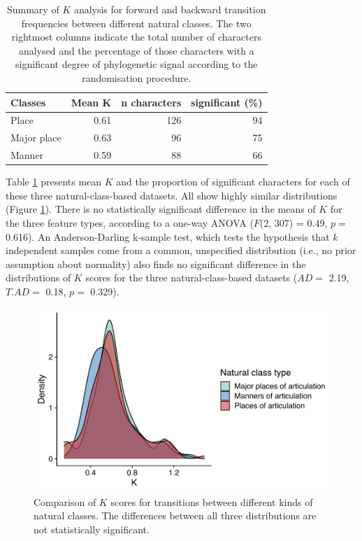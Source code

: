 \begin{table}

\caption[Summary of $K$ analysis for forward and backward transition frequencies, comparing different natural classes]{\label{tab:k-natural-classes-summary}Summary of $K$ analysis for forward and backward transition frequencies between different natural classes. The two rightmost columns indicate the total number of characters analysed and the percentage of those characters with a significant degree of phylogenetic signal according to the randomisation procedure.}
\centering
\begin{tabular}[t]{lrrr}
\toprule
Classes & Mean K & n characters & significant (\%)\\
\midrule
Place & 0.61 & 126 & 94\\
Major place & 0.63 & 96 & 75\\
Manner & 0.59 & 88 & 66\\
\bottomrule
\end{tabular}
\end{table}

Table \ref{tab:k-natural-classes-summary} presents mean \(K\) and the proportion of significant characters for each of these three natural-class-based datasets. All show highly similar distributions (Figure \ref{fig:k-natural-classes}). There is no statistically significant difference in the means of \(K\) for the three feature types, according to a one-way ANOVA (\(F\)(2, 307) = 0.49, \(p=\) 0.616). An Anderson-Darling k-sample test, which tests the hypothesis that \(k\) independent samples come from a common, unspecified distribution (i.e., no prior assumption about normality) also finds no significant difference in the distributions of \(K\) scores for the three natural-class-based datasets (\(AD=\) 2.19, \(T.AD=\) 0.18, \(p=\) 0.329).

\begin{figure}[tbp]

{\centering \includegraphics[width=0.66\linewidth]{05-phylo-signal/fig/k-natural-classes} 

}

\caption[Comparison of $K$ scores for transitions between different kinds of natural classes]{Comparison of $K$ scores for transitions between different kinds of natural classes. The differences between all three distributions are not statistically significant.}\label{fig:k-natural-classes}
\end{figure}

